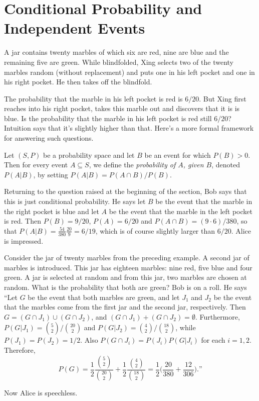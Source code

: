 \section{Conditional Probability and Independent Events}

A jar contains twenty marbles of which six are red, nine are blue
and the remaining five are green.  While blindfolded, Xing selects two of the twenty 
marbles random (without replacement) and puts one in his left pocket and
one in his right pocket.  He then takes off the blindfold.

The probability that the marble in his left pocket is red is $6/20$.
But Xing first reaches into his right pocket, takes this marble out and
discovers that it is is blue.  Is the probability that the marble in
his left pocket is red still $6/20$?  Intuition says that it's slightly
higher than that.  Here's a more formal framework for answering such
questions.

Let $(S,P)$ be a probability space and let $B$ be an event for
which $P(B)>0$.  Then for every event $A\subseteq S$, we define
the \textit{probability of $A$, given $B$}, denoted $P(A|B)$, by setting
$P(A|B)=P(A\cap B)/P(B)$.  

\begin{discussion}
  Returning to the question raised at the beginning of the section,
  Bob says that this is just conditional probability. He says let $B$
  be the event that the marble in the right pocket is blue and let $A$
  be the event that the marble in the left pocket is red.  Then
  $P(B)=9/20$, $P(A) = 6/20$ and $P(A\cap B)=(9\cdot6)/380$, so that
  $P(A|B)= \frac{54}{380}\frac{20}{9}=6/19$, which is of course
  slightly larger than $6/20$.  Alice is impressed.
\end{discussion}

\begin{example}\label{exa:twojars}
  Consider the jar of twenty marbles from the preceding example.  A
  second jar of marbles is introduced.  This jar has eighteen marbles:
  nine red, five blue and four green.  A jar is selected at random and
  from this jar, two marbles are chosen at random.  What is the
  probability that both are green?  Bob is on a roll.  He says ``Let $G$
  be the event that both marbles are green, and let $J_1$ and $J_2$ be
  the event that the marbles come from the first jar and the second
  jar, respectively.  Then $G= (G\cap J_1)\cup (G\cap J_2)$, and
  $(G\cap J_1)+(G\cap J_2)=\emptyset$.  Furthermore,
  $P(G|J_1)=\binom{5}{2}/\binom{20}{2}$ and
  $P(G|J_2)=\binom{4}{2}/\binom{18}{2}$, while $P(J_1)=P(J_2)=1/2$.
  Also $P(G\cap J_i)=P(J_i)P(G|J_i)$ for each $i=1,2$.  Therefore,
\[
P(G)=\frac{1}{2}\frac{\binom{5}{2}}{\binom{20}{2}}+
\frac{1}{2}\frac{\binom{4}{2}}{\binom{18}{2}}=\frac{1}{2}\bigl(\frac{20}{380}+
\frac{12}{306}\bigr).\text{''}
\]

Now Alice is speechless.
\end{example}

